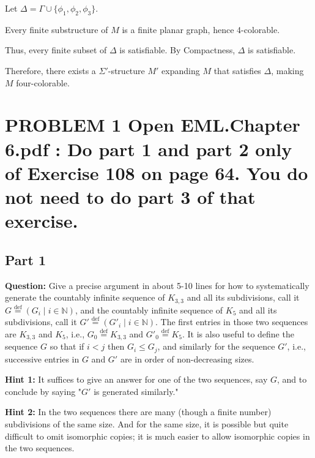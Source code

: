 \documentclass{article}
\begin{document}
Let $\Delta = \Gamma \cup \{\phi_1, \phi_2, \phi_3\}$. 

\vspace{1em}
Every finite substructure of $M$ is a finite planar graph, hence 4-colorable. 

\vspace{1em}
Thus, every finite subset of $\Delta$ is satisfiable. By Compactness, $\Delta$ is satisfiable.

\vspace{1em}
Therefore, there exists a $\Sigma'$-structure $M'$ expanding $M$ that satisfies $\Delta$, making $M$ four-colorable.
\newpage




\section*{PROBLEM 1 Open EML.Chapter 6.pdf : Do part 1 and part 2 only of Exercise 108 on page
64. You do not need to do part 3 of that exercise.}


\subsection*{Part 1}


\vspace{1em}
\begin{mdframed}
    \textbf{Question:} Give a precise argument in about 5-10 lines for how to systematically generate the countably infinite sequence of $K_{3,3}$ and all its subdivisions, call it $G \stackrel{\text{def}}{=} (G_i \mid i \in \mathbb{N})$, and the countably infinite sequence of $K_5$ and all its subdivisions, call it $G' \stackrel{\text{def}}{=} (G'_i \mid i \in \mathbb{N})$. The first entries in those two sequences are $K_{3,3}$ and $K_5$, i.e., $G_0 \stackrel{\text{def}}{=} K_{3,3}$ and $G'_0 \stackrel{\text{def}}{=} K_5$. It is also useful to define the sequence $G$ so that if $i < j$ then $G_i \leq G_j$, and similarly for the sequence $G'$, i.e., successive entries in $G$ and $G'$ are in order of non-decreasing sizes.

    \vspace{1em}
    \textbf{Hint 1:} It suffices to give an answer for one of the two sequences, say $G$, and to conclude by saying "$G'$ is generated similarly."

    \vspace{1em}
    \textbf{Hint 2:} In the two sequences there are many (though a finite number) subdivisions of the same size. And for the same size, it is possible but quite difficult to omit isomorphic copies; it is much easier to allow isomorphic copies in the two sequences.

    
\end{mdframed}
\end{document}
